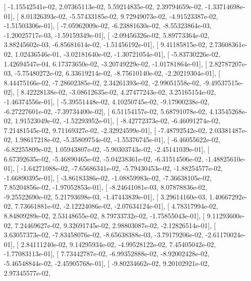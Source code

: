 \documentclass{article}
\begin{document}
       [ -1.15542541e-02,   2.07365113e-02,   5.59214835e-02,
          2.39794659e-02,  -1.33714698e-01],
       [  8.01326393e-02,  -5.57433185e-02,   9.72949073e-02,
         -4.91523387e-02,  -1.51503306e-01],
       [ -7.05962009e-02,  -6.23881630e-02,  -8.55323864e-03,
         -1.20025717e-03,  -1.59159349e-01],
       [ -2.09456326e-02,   5.89773364e-02,   3.88245602e-03,
         -6.85681614e-02,  -1.51456192e-01],
       [  9.41185815e-02,   2.73608361e-02,   1.02436546e-01,
         -3.02181640e-02,  -1.30721054e-01],
       [ -5.83730226e-02,   1.42694547e-04,   6.17373650e-02,
         -3.20749229e-02,  -1.01781864e-01],
       [  2.82787207e-03,  -5.75480272e-02,   6.33619214e-02,
         -8.75610140e-02,  -2.20219304e-01],
       [  8.44475166e-02,  -7.28602385e-02,   2.34261393e-02,
         -2.99051558e-02,  -9.49537515e-02],
       [  8.42228138e-02,  -3.08612635e-02,   4.27477243e-02,
          3.25165154e-02,  -1.46374556e-01],
       [ -5.39551448e-02,   4.10250745e-02,  -9.17900238e-02,
         -6.27227601e-02,  -7.39734400e-02],
       [  6.51154157e-02,   5.68791078e-02,   4.13545268e-02,
          1.91523049e-02,  -1.52293952e-01],
       [ -8.42772373e-02,  -6.46091274e-02,   7.21481545e-02,
          9.71169327e-02,  -2.32924599e-01],
       [ -7.48792542e-02,   2.03381487e-02,   1.98617218e-02,
         -5.35809754e-02,  -1.55376745e-01],
       [ -6.46055622e-02,  -6.82255809e-02,   1.05943807e-02,
         -5.90303743e-02,  -2.45141039e-01],
       [  6.67392635e-02,  -5.46890465e-02,  -5.04238361e-02,
         -6.31514506e-02,  -1.48825610e-01],
       [ -1.64271088e-02,  -7.65686341e-02,  -5.79430453e-02,
         -1.88254577e-02,  -1.66890395e-01],
       [ -3.86183386e-02,  -1.08859983e-02,  -7.36638105e-02,
          7.85204856e-02,  -1.97052853e-01],
       [ -8.24641081e-03,   8.07878836e-02,  -9.25522690e-02,
          5.21793698e-03,  -1.47443839e-01],
       [  3.29614160e-03,   1.40667292e-02,   7.73661881e-02,
         -2.12224086e-02,  -2.07634124e-01],
       [  4.78317994e-02,   8.84809289e-02,   2.53148655e-02,
          8.79733732e-02,  -1.75855043e-01],
       [  9.11293600e-02,   7.24469627e-02,   9.32691745e-02,
          2.98803087e-02,  -2.12826514e-01],
       [  3.63057373e-02,  -7.83458076e-02,  -8.65638388e-03,
         -3.79179206e-02,  -2.61170024e-01],
       [  2.84111240e-02,   9.14295934e-02,  -4.99528122e-02,
          7.45405042e-02,  -1.77083113e-01],
       [  7.73442787e-02,  -6.99352888e-02,  -8.92002428e-02,
         -5.46548844e-02,  -2.45905768e-01],
       [ -9.80234662e-02,   9.20102921e-02,   2.97345577e-02,
\end{document}
